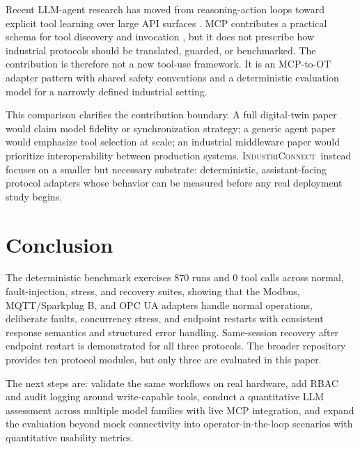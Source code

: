 \documentclass[conference]{IEEEtran}
\newcommand{\system}{\textsc{IndustriConnect}}
\newcommand{\totalRuns}{870}
\newcommand{\totalToolCalls}{0}
\begin{document}
Recent LLM-agent research has moved from reasoning-action loops toward explicit tool learning over large API surfaces \cite{yao2022react,schick2023toolformer,patil2023gorilla,qiao2024executionfeedback}. MCP contributes a practical schema for tool discovery and invocation \cite{anthropic2024mcp}, but it does not prescribe how industrial protocols should be translated, guarded, or benchmarked. The contribution is therefore not a new tool-use framework. It is an MCP-to-OT adapter pattern with shared safety conventions and a deterministic evaluation model for a narrowly defined industrial setting.

This comparison clarifies the contribution boundary. A full digital-twin paper would claim model fidelity or synchronization strategy; a generic agent paper would emphasize tool selection at scale; an industrial middleware paper would prioritize interoperability between production systems. \system\ instead focuses on a smaller but necessary substrate: deterministic, assistant-facing protocol adapters whose behavior can be measured before any real deployment study begins.

\section{Conclusion}
\label{sec:conclusion}

The deterministic benchmark exercises \totalRuns{} runs and \totalToolCalls{} tool calls across normal, fault-injection, stress, and recovery suites, showing that the Modbus, MQTT/Sparkplug B, and OPC UA adapters handle normal operations, deliberate faults, concurrency stress, and endpoint restarts with consistent response semantics and structured error handling. Same-session recovery after endpoint restart is demonstrated for all three protocols. The broader repository provides ten protocol modules, but only three are evaluated in this paper.

The next steps are: validate the same workflows on real hardware, add RBAC and audit logging around write-capable tools, conduct a quantitative LLM assessment across multiple model families with live MCP integration, and expand the evaluation beyond mock connectivity into operator-in-the-loop scenarios with quantitative usability metrics.



\end{document}
